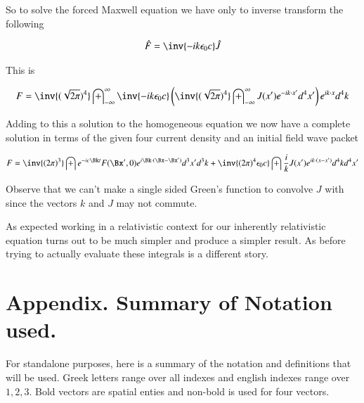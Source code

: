 \documentclass{article}
\newcommand{\IIinf}[0]{ \int_{-\infty}^\infty }
\begin{document}
So to solve the forced Maxwell equation we have only to inverse transform the following

\begin{align*}
\hat{F} = \inv{ -i k \epsilon_0 c} \hat{J}
\end{align*}

This is 

\begin{align*}
{F} 
&= \inv{(\sqrt{2\pi})^4} \IIinf \inv{ -i k \epsilon_0 c} \left( \inv{(\sqrt{2\pi})^4} \IIinf J(x') e^{ -i k \cdot x' } d^4 x' \right) e^{ i k \cdot x } d^4 k \\
\end{align*}

Adding to this a solution to the homogeneous equation we now have a complete solution in terms of the given four current density and an
initial field wave packet

\begin{align*}
{F} &= 
\inv{({2\pi})^3} \int e^{ -i c \Bk t } F(\Bx', 0) e^{ i \Bk \cdot (\Bx-\Bx') } d^3 x' d^3 k  
+
\inv{ ({2\pi})^4 \epsilon_0 c} \int \frac{i}{ k } J(x') e^{ i k \cdot (x - x') } d^4 k d^4 x' \\
\end{align*}

Observe that we can't make a single sided Green's function to convolve $J$ with since the vectors $k$ and $J$ may not commute.

As expected working in a relativistic context for our inherently relativistic equation turns out to be much simpler and produce a simpler result.  As before 
trying to actually evaluate these integrals is a different story.

\section{ Appendix.  Summary of Notation used. }

% 
%
For standalone purposes, here is a summary of the notation and definitions that will be used.  Greek letters range over all indexes and
english indexes range over $1,2,3$.  Bold vectors are spatial enties and non-bold is used for four vectors.
\end{document}
